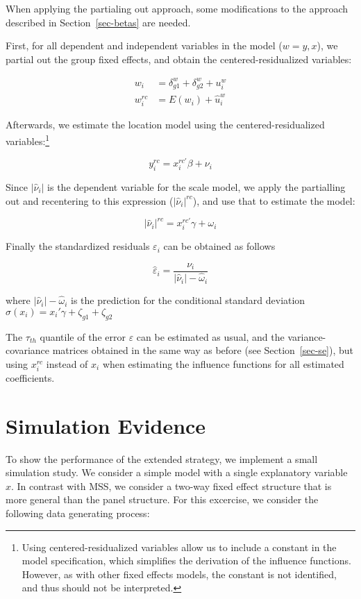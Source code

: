 \documentclass[
  authoryear,
  review,
  1p]{elsarticle}
\begin{document}
When applying the partialing out approach, some modifications to the
approach described in Section~\ref{sec-betas} are needed.

First, for all dependent and independent variables in the model
(\(w=y,x\)), we partial out the group fixed effects, and obtain the
centered-residualized variables:

\[\begin{aligned}
w_{i} &= \delta_{g1}^w + \delta_{g2}^w + u_{i}^w \\
w_{i}^{rc} &= E(w_{i}) + \hat{u}_{i}^w
\end{aligned}
\]

Afterwards, we estimate the location model using the
centered-residualized variables:\footnote{Using centered-residualized
  variables allow us to include a constant in the model specification,
  which simplifies the derivation of the influence functions. However,
  as with other fixed effects models, the constant is not identified,
  and thus should not be interpreted.}

\[y_{i}^{rc} = x_{i}^{rc'} \beta + \nu_{i}
\]

Since \(|\hat \nu_i|\) is the dependent variable for the scale model, we
apply the partialling out and recentering to this expression
(\(|\hat \nu_i|^{rc}\)), and use that to estimate the model:

\[|\hat\nu_{i}|^{rc} = x_{i}^{rc'} \gamma + \omega_{i}\]

Finally the standardized residuals \(\varepsilon_i\) can be obtained as
follows

\[\hat{\varepsilon}_{i} = \frac{\nu_{i}}{|\hat\nu_{i}|- \hat \omega_{i}}\]

where \(|\hat\nu_{i}|- \hat \omega_{i}\) is the prediction for the
conditional standard deviation
\(\sigma(x_i)=x_{i}' \gamma + \zeta_{g1} + \zeta_{g2}\)

The \(\tau_{th}\) quantile of the error \(\varepsilon\) can be estimated
as usual, and the variance-covariance matrices obtained in the same way
as before (see Section~\ref{sec-se}), but using \(x_{i}^{rc}\) instead
of \(x_{i}\) when estimating the influence functions for all estimated
coefficients.

\section{Simulation Evidence}\label{simulation-evidence}

To show the performance of the extended strategy, we implement a small
simulation study. We consider a simple model with a single explanatory
variable \(x\). In contrast with MSS, we consider a two-way fixed effect
structure that is more general than the panel structure. For this
excercise, we consider the following data generating process:
\end{document}
